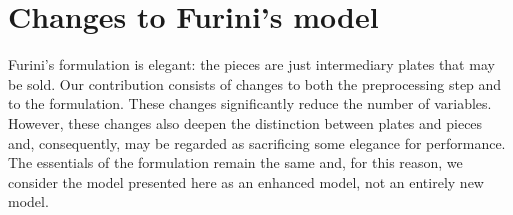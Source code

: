 \documentclass[ppgc,prop-tese,english,formais,babel]{iiufrgs}
\begin{document}
\begin{comment}
\section{Expanded example for thesis proposal}

I need an original plate and about 3~5 pieces.
Ideally the original plate should already be size-normalized, to be fair.
The smallest piece needs to be distant of one in absolute terms, but cannot be on the relatively large side, because this makes harder for an intermediary plate have many replacements.
We may use only squares, but this is kinda boring.
Probably the easiest way is to make a branch of the code in which the code enumerating plates saves which non-normalized plates were replaced by each normalized plate and outputs them.
\end{comment}

\chapter{Changes to Furini's model}
\label{sec:enhanced_model}


Furini's formulation is elegant: the pieces are just intermediary plates that may be sold.
Our contribution consists of changes to both the preprocessing step and to the formulation.
These changes significantly reduce the number of variables.
However, these changes also deepen the distinction between plates and pieces and, consequently, may be regarded as sacrificing some elegance for performance.
The essentials of the formulation remain the same and, for this reason, we consider the model presented here as an enhanced model, not an entirely new model.

\end{document}

